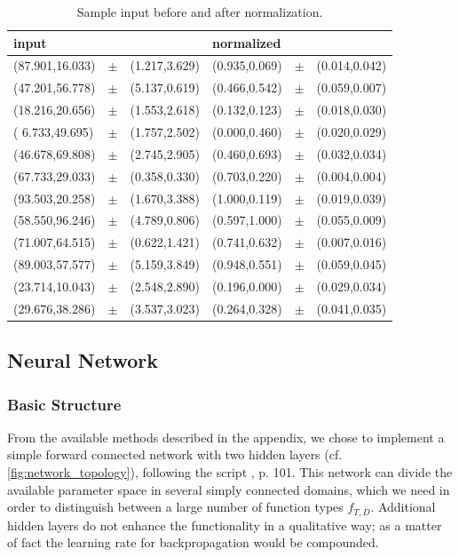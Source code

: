 \documentclass[useAMS,usenatbib]{templates/mn2e}
\begin{document}
\begin{table}
\begin{center}
\begin{tabular}{lcllcl}\hline\hline
input&&&normalized&&\\
\hline
(87.901,16.033)&$\pm$&(1.217,3.629) & (0.935,0.069)&$\pm$&(0.014,0.042)\\
(47.201,56.778)&$\pm$&(5.137,0.619) & (0.466,0.542)&$\pm$&(0.059,0.007)\\
(18.216,20.656)&$\pm$&(1.553,2.618) & (0.132,0.123)&$\pm$&(0.018,0.030)\\
( 6.733,49.695)&$\pm$&(1.757,2.502) & (0.000,0.460)&$\pm$&(0.020,0.029)\\
(46.678,69.808)&$\pm$&(2.745,2.905) & (0.460,0.693)&$\pm$&(0.032,0.034)\\
(67.733,29.033)&$\pm$&(0.358,0.330) & (0.703,0.220)&$\pm$&(0.004,0.004)\\
(93.503,20.258)&$\pm$&(1.670,3.388) & (1.000,0.119)&$\pm$&(0.019,0.039)\\
(58.550,96.246)&$\pm$&(4.789,0.806) & (0.597,1.000)&$\pm$&(0.055,0.009)\\
(71.007,64.515)&$\pm$&(0.622,1.421) & (0.741,0.632)&$\pm$&(0.007,0.016)\\
(89.003,57.577)&$\pm$&(5.159,3.849) & (0.948,0.551)&$\pm$&(0.059,0.045)\\
(23.714,10.043)&$\pm$&(2.548,2.890) & (0.196,0.000)&$\pm$&(0.029,0.034)\\
(29.676,38.286)&$\pm$&(3.537,3.023) & (0.264,0.328)&$\pm$&(0.041,0.035)\\
\hline
\end{tabular}
\end{center}
\caption{\label{tab:ti1} Sample input before and after normalization.}
\end{table}

\subsection{Neural Network}
\subsubsection{Basic Structure}
From the available methods described in the appendix, we chose to
implement a simple forward connected network with two hidden layers
(cf. \ref{fig:network_topology}), following the script
\cite{Stoop2010}, p. 101. This network can divide the available
parameter space in several simply connected domains, which we need in
order to distinguish between a large number of function types
$f_{T,D}$. Additional hidden layers do not enhance the functionality
in a qualitative way; as a matter of fact the learning rate for
backpropagation would be compounded.
\end{document}

